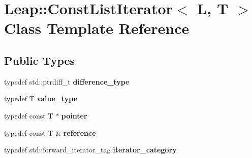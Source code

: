 \hypertarget{class_leap_1_1_const_list_iterator}{\section{Leap\+:\+:Const\+List\+Iterator$<$ L, T $>$ Class Template Reference}
\label{class_leap_1_1_const_list_iterator}
}
\subsection*{Public Types}
\begin{DoxyCompactItemize}
\item 
\hypertarget{class_leap_1_1_const_list_iterator_a98b3522472d31af5f11938113a1c6374}{typedef std\+::ptrdiff\+\_\+t {\bfseries difference\+\_\+type}}\label{class_leap_1_1_const_list_iterator_a98b3522472d31af5f11938113a1c6374}

\item 
\hypertarget{class_leap_1_1_const_list_iterator_adf95da5a87dd11b14108fc7cb7cd62c4}{typedef T {\bfseries value\+\_\+type}}\label{class_leap_1_1_const_list_iterator_adf95da5a87dd11b14108fc7cb7cd62c4}

\item 
\hypertarget{class_leap_1_1_const_list_iterator_a734c2930469ac06ec6c9244a82e1f891}{typedef const T $\ast$ {\bfseries pointer}}\label{class_leap_1_1_const_list_iterator_a734c2930469ac06ec6c9244a82e1f891}

\item 
\hypertarget{class_leap_1_1_const_list_iterator_a0dc935bc99abee02e4bdd31b4824ac0d}{typedef const T \& {\bfseries reference}}\label{class_leap_1_1_const_list_iterator_a0dc935bc99abee02e4bdd31b4824ac0d}

\item 
\hypertarget{class_leap_1_1_const_list_iterator_a86e06a3cb1723af34caf1f900db86445}{typedef std\+::forward\+\_\+iterator\+\_\+tag {\bfseries iterator\+\_\+category}}\label{class_leap_1_1_const_list_iterator_a86e06a3cb1723af34caf1f900db86445}

\end{DoxyCompactItemize}
